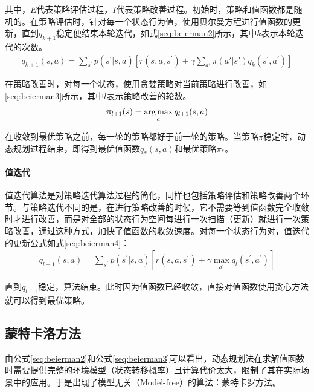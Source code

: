 其中，$E$代表策略评估过程，$I$代表策略改善过程。初始时，策略和值函数都是随机的。在策略评估时，针对每一个状态行为值，使用贝尔曼方程进行值函数的更新，直到$q_{k+1}$稳定便结束本轮迭代，如式\eqref{seq:beierman2}所示，其中$k$表示本轮迭代的次数。
\begin{equation}\label{seq:beierman2}
\begin{aligned}
q_{k+1}(s,a)=\sum_{s^{'}}p(s^{'}|s,a)[r(s,a,s^{'})+ \gamma \sum_{a'}\pi(a'|s') q_{k}(s^{'},a^{'})]
\end{aligned}
\end{equation}

在策略改善时，对每一个状态，使用贪婪策略对当前策略进行改善，如\eqref{seq:beierman3}所示，其中$l$表示策略改善的轮数。
\begin{equation}\label{seq:beierman3}
\begin{aligned}
\uppi_{l+1}(s)=\operatorname*{arg\,max}_{a}q_{l+1}(s,a)
\end{aligned}
\end{equation}

在收敛到最优策略之前，每一轮的策略都好于前一轮的策略。当策略$\pi$稳定时，动态规划过程结束，即得到最优值函数$q_{*}(s,a)$和最优策略$\pi_{*}$。
\paragraph{值迭代}

值迭代算法是对策略迭代算法过程的简化，同样也包括策略评估和策略改善两个环节。与策略迭代不同的是，在进行策略改善的时候，它不需要等到值函数完全收敛时才进行改善，而是对全部的状态行为空间每进行一次扫描（更新）就进行一次策略改善，通过这种方式，加快了值函数的收敛速度。对每一个状态行为对，值迭代的更新公式如式\eqref{seq:beierman4}：
\begin{equation}
\begin{aligned}\label{seq:beierman4}
q_{l+1}(s,a)=\sum_{s^{'}}p(s^{'}|s,a)[r(s,a,s^{'})+ \gamma \max_{a^{'}} q_{l}(s^{'},a^{'})]
\end{aligned}
\end{equation}

直到$q_{l+1}$稳定，算法结束。此时因为值函数已经收敛，直接对值函数使用贪心方法就可以得到最优策略。

\subsection{蒙特卡洛方法}
由公式\eqref{seq:beierman2}和公式\eqref{seq:beierman3}可以看出，动态规划法在求解值函数时需要提供完整的环境模型（状态转移概率）且计算代价太大，限制了其在实际场景中的应用。于是出现了模型无关（Model-free）的算法：蒙特卡罗方法。


